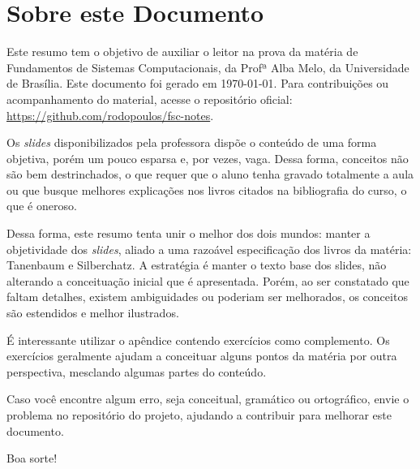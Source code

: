 \chapter*{Sobre este Documento}

Este resumo tem o objetivo de auxiliar o leitor na prova da matéria de Fundamentos de Sistemas Computacionais, da Profª Alba Melo, da Universidade de Brasília. Este documento foi gerado em \today. Para contribuições ou acompanhamento do material, acesse o repositório oficial: \url{https://github.com/rodopoulos/fsc-notes}.

Os \textit{slides} disponibilizados pela professora dispõe o conteúdo de uma forma objetiva, porém um pouco esparsa e, por vezes, vaga. Dessa forma, conceitos não são bem destrinchados, o que requer que o aluno tenha gravado totalmente a aula ou que busque melhores explicações nos livros citados na bibliografia do curso, o que é oneroso.

Dessa forma, este resumo tenta unir o melhor dos dois mundos: manter a objetividade dos \textit{slides}, aliado a uma razoável especificação dos livros da matéria: Tanenbaum e Silberchatz. A estratégia é manter o texto base dos slides, não alterando a conceituação inicial que é apresentada. Porém, ao ser constatado que faltam detalhes, existem ambiguidades ou poderiam ser melhorados, os conceitos são estendidos e melhor ilustrados.

É interessante utilizar o apêndice contendo exercícios como complemento. Os exercícios geralmente ajudam a conceituar alguns pontos da matéria por outra perspectiva, mesclando algumas partes do conteúdo.

Caso você encontre algum erro, seja conceitual, gramático ou ortográfico, envie o problema no repositório do projeto, ajudando a contribuir para melhorar este documento.

Boa sorte!
